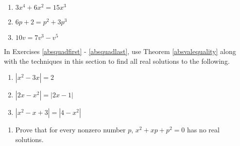 \documentclass[10pt]{article}
\begin{document}
\begin{multicols}{3}
\begin{enumerate}
\setcounter{enumi}{\value{HW}}

\item $3x^4 + 6x^2 = 15x^3$
\item $6p + 2 = p^2 + 3p^3$
\item $10v = 7v^3 - v^5$\label{solvequadlast}

\setcounter{HW}{\value{enumi}}
\end{enumerate}
\end{multicols}













In Exercises \ref{absquadfirst} - \ref{absquadlast}, use Theorem \ref{absvalequality} along with the techniques in this section to find all real solutions to the following.

\begin{multicols}{3}
\begin{enumerate}
\setcounter{enumi}{\value{HW}}

\item $|x^2 - 3x| = 2$ \label{absquadfirst}
\item $|2x-x^2| = |2x-1|$
\item $|x^2 -x + 3| = |4-x^2|$ \label{absquadlast}

\setcounter{HW}{\value{enumi}}
\end{enumerate}
\end{multicols}

\begin{enumerate}
\setcounter{enumi}{\value{HW}}

\item  Prove that for every nonzero number $p$, $x^2 + xp + p^2 = 0$  has no real solutions.

\setcounter{HW}{\value{enumi}}
\end{enumerate}





\closegraphsfile
\end{document}
